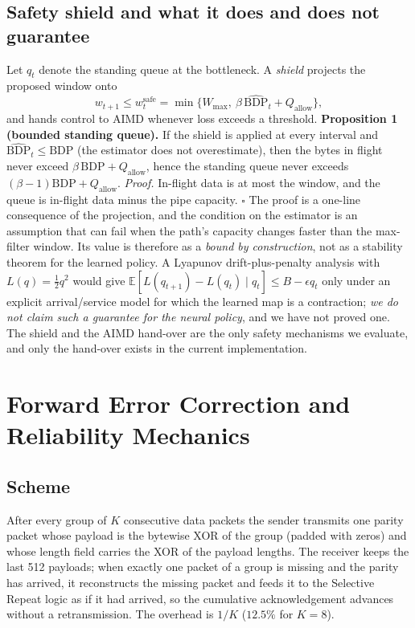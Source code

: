 \subsection{Safety shield and what it does and does not guarantee}
\label{sec:safety}
Let $q_t$ denote the standing queue at the bottleneck. A \emph{shield} projects the proposed window onto
\begin{equation}
w_{t+1}\le w^{\mathrm{safe}}_t=\min\{W_{\max},\ \beta\,\widehat{\mathrm{BDP}}_t+Q_{\mathrm{allow}}\},
\end{equation}
and hands control to AIMD whenever loss exceeds a threshold. \textbf{Proposition 1 (bounded standing queue).} If the shield is applied at every interval and $\widehat{\mathrm{BDP}}_t\le \mathrm{BDP}$ (the estimator does not overestimate), then the bytes in flight never exceed $\beta\,\mathrm{BDP}+Q_{\mathrm{allow}}$, hence the standing queue never exceeds $(\beta-1)\mathrm{BDP}+Q_{\mathrm{allow}}$.
\emph{Proof.} In-flight data is at most the window, and the queue is in-flight data minus the pipe capacity. $\square$
The proof is a one-line consequence of the projection, and the condition on the estimator is an assumption that can fail when the path's capacity changes faster than the max-filter window. Its value is therefore as a \emph{bound by construction}, not as a stability theorem for the learned policy.
A Lyapunov drift-plus-penalty analysis with $L(q)=\tfrac12 q^2$ would give $\mathbb{E}[L(q_{t+1})-L(q_t)\mid q_t]\le B-\epsilon q_t$ only under an explicit arrival/service model for which the learned map is a contraction; \emph{we do not claim such a guarantee for the neural policy}, and we have not proved one. The shield and the AIMD hand-over are the only safety mechanisms we evaluate, and only the hand-over exists in the current implementation.

\section{Forward Error Correction and Reliability Mechanics}
\label{sec:fec}
\subsection{Scheme}
After every group of $K$ consecutive data packets the sender transmits one parity packet whose payload is the bytewise XOR of the group (padded with zeros) and whose length field carries the XOR of the payload lengths. The receiver keeps the last 512 payloads; when exactly one packet of a group is missing and the parity has arrived, it reconstructs the missing packet and feeds it to the Selective Repeat logic as if it had arrived, so the cumulative acknowledgement advances without a retransmission. The overhead is $1/K$ ($12.5\%$ for $K=8$).

